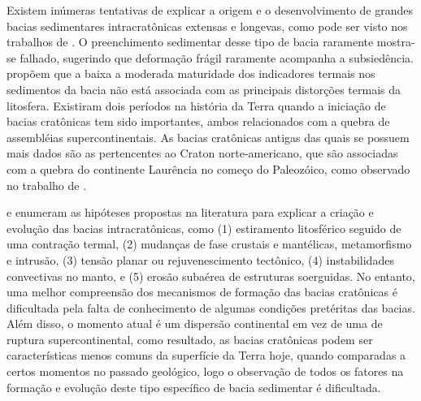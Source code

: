 Existem inúmeras tentativas de explicar a origem e o desenvolvimento de grandes bacias  sedimentares intracratônicas extensas e longevas, como pode ser visto nos trabalhos de \cite{hartley_interior_1994,kaminski_lithosphere_2000,armitage_subsidence_2010,mkenzie_speculations_2016}. O preenchimento sedimentar desse tipo de bacia raramente mostra-se falhado, sugerindo que deformação frágil raramente acompanha a subsiedência. \cite{hartley_interior_1994} propõem que a baixa a moderada maturidade dos indicadores termais nos sedimentos da bacia não está associada com as principais distorções termais da litosfera. Existiram dois períodos na história da Terra quando a iniciação de bacias cratônicas tem sido importantes, ambos relacionados com a quebra de assembléias supercontinentais. As bacias cratônicas antigas das quais se possuem mais dados são as pertencentes ao Craton norte-americano, que são associadas com a quebra do continente Laurência no começo do Paleozóico, como observado no trabalho de \cite{kaminski_lithosphere_2000}. 

\cite{hartley_interior_1994} e \cite{allen_cratonic_2012} enumeram as hipóteses propostas na literatura para explicar a criação e evolução das bacias intracratônicas, como (1) estiramento litosférico seguido de uma contração termal,  (2) mudanças de fase crustais e mantélicas,  metamorfismo e intrusão, (3) tensão planar ou rejuvenescimento tectônico, (4) instabilidades convectivas no manto, e (5) erosão subaérea de estruturas soerguidas. No entanto, uma melhor compreensão dos mecanismos de formação das bacias cratônicas é dificultada pela falta de conhecimento de algumas condições pretéritas das bacias. Além disso, o momento atual é um dispersão continental em vez de uma de ruptura supercontinental, como resultado, as bacias cratônicas podem ser características menos comuns da superfície da Terra hoje, quando comparadas a certos momentos no passado geológico, logo o observação de todos os fatores na formação e evolução deste tipo específico de bacia sedimentar é dificultada.




